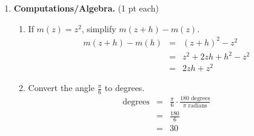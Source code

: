 \documentclass[11pt,letterpaper]{article}
\begin{document}
\begin{enumerate}
\item \textbf{Computations/Algebra.} (1 pt each) 
\begin{enumerate}
\item If $m(z)=z^2$, simplify $m(z+h)-m(z)$.
\begin{eqnarray*}
m(z+h)-m(h) &=& (z+h)^2-z^2 \\
&=& z^2+2zh+h^2-z^2 \\
&=& 2zh +z^2 
\end{eqnarray*}
\vspace{.5pc}
\item Convert the angle $\frac{\pi }{6}$ to degrees.
\begin{eqnarray*}
 \text{degrees} &=& \frac{\pi }{6}\cdot \frac{180 \text{ degrees}}{\pi \text{ radians}} \\
&=& \frac{180}{6} \\
&=& 30
\end{eqnarray*}


\end{enumerate}

\end{enumerate}
\end{document}

